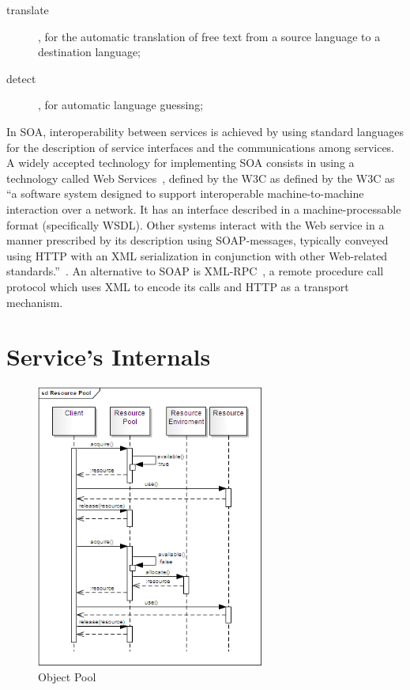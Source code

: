 \documentclass[11pt]{article}
\begin{document}
\begin{description}
  \item[translate], for the automatic translation of free text from a source language to a destination language;
  \item[detect], for automatic language guessing;
\end{description}

In SOA, interoperability between services is achieved by using standard languages for the description of service interfaces and the communications
among services. A widely accepted technology for implementing SOA consists in using a technology called Web Services~\cite{soa}, defined by the W3C
as defined by the W3C as ``a software system designed to support interoperable machine-to-machine interaction over a network. It has an interface 
described in a machine-processable format (specifically WSDL). Other systems interact with the Web service in a manner prescribed by its description 
using SOAP-messages, typically conveyed using HTTP with an XML serialization in conjunction with other Web-related standards.''~\cite{wsgloss}. An
alternative to SOAP is XML-RPC~\cite{xmlrpcspec}, a remote procedure call protocol which uses XML to encode its calls and HTTP as a transport mechanism.\\

\section{Service's Internals}



\begin{figure}[!ht]
\begin{center}
\includegraphics[width=7.5cm]{resource_pool}
\end{center}
\caption{Object Pool}
\label{fig:rp}
\end{figure}
\end{document}
